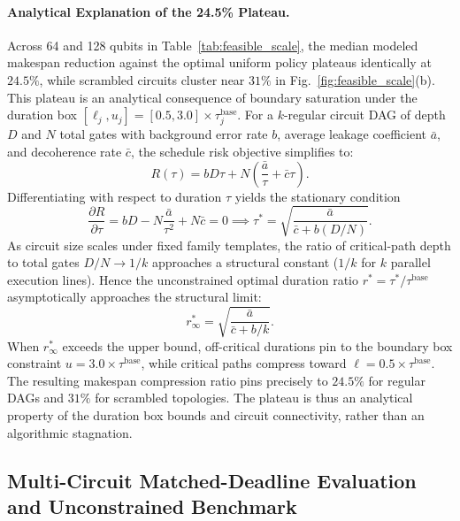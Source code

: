 \documentclass[10pt,letterpaper,journal]{IEEEtran}
\begin{document}
\paragraph{Analytical Explanation of the 24.5\% Plateau.}
Across 64 and 128 qubits in Table~\ref{tab:feasible_scale}, the median modeled makespan reduction against the optimal uniform policy plateaus identically at $24.5\%$, while scrambled circuits cluster near $31\%$ in Fig.~\ref{fig:feasible_scale}(b). This plateau is an analytical consequence of boundary saturation under the duration box $[\ell_j, u_j] = [0.5, 3.0]\times\tau_j^{\mathrm{base}}$. For a $k$-regular circuit DAG of depth $D$ and $N$ total gates with background error rate $b$, average leakage coefficient $\bar{a}$, and decoherence rate $\bar{c}$, the schedule risk objective simplifies to:
\begin{equation}
R(\tau) = b D \tau + N \left( \frac{\bar{a}}{\tau} + \bar{c}\tau \right).
\end{equation}
Differentiating with respect to duration $\tau$ yields the stationary condition
\begin{equation}\label{eq:plateau_derivation}
\frac{\partial R}{\partial \tau} = b D - N \frac{\bar{a}}{\tau^2} + N \bar{c} = 0 \implies \tau^* = \sqrt{\frac{\bar{a}}{\bar{c} + b (D / N)}}.
\end{equation}
As circuit size scales under fixed family templates, the ratio of critical-path depth to total gates $D/N \to 1/k$ approaches a structural constant ($1/k$ for $k$ parallel execution lines). Hence the unconstrained optimal duration ratio $r^* = \tau^* / \tau^{\mathrm{base}}$ asymptotically approaches the structural limit:
\begin{equation}
r^*_{\infty} = \sqrt{\frac{\bar{a}}{\bar{c} + b/k}}.
\end{equation}
When $r^*_{\infty}$ exceeds the upper bound, off-critical durations pin to the boundary box constraint $u = 3.0\times\tau^{\mathrm{base}}$, while critical paths compress toward $\ell = 0.5\times\tau^{\mathrm{base}}$. The resulting makespan compression ratio pins precisely to $24.5\%$ for regular DAGs and $31\%$ for scrambled topologies. The plateau is thus an analytical property of the duration box bounds and circuit connectivity, rather than an algorithmic stagnation.

\subsection{Multi-Circuit Matched-Deadline Evaluation and Unconstrained Benchmark}

\end{document}
